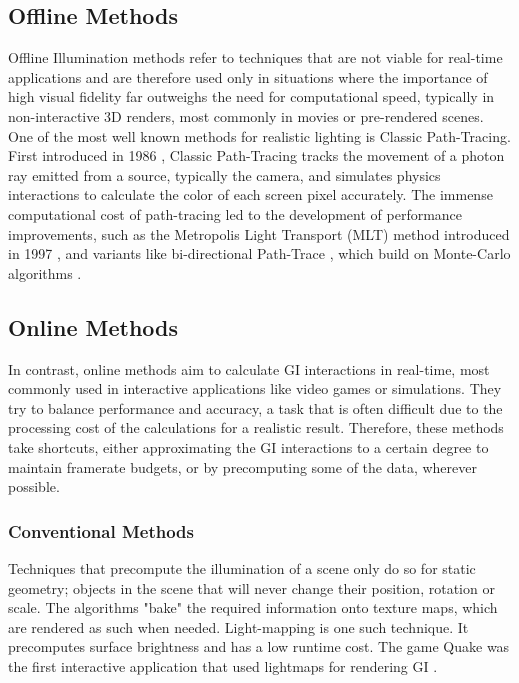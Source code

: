 \subsection{Offline Methods}
\label{sec:offline}
Offline Illumination methods refer to techniques that are not viable for real-time applications and are therefore used only in situations where the importance of high visual fidelity far outweighs the need for computational speed, typically in non-interactive 3D renders, most commonly in movies or pre-rendered scenes. One of the most well known methods for realistic lighting is Classic Path-Tracing. First introduced in 1986 \parencite{Kajiya1986}, Classic Path-Tracing tracks the movement of a photon ray emitted from a source, typically the camera, and simulates physics interactions to calculate the color of each screen pixel accurately. The immense computational cost of path-tracing led to the development of performance improvements, such as the Metropolis Light Transport (MLT) method introduced in 1997 \parencite{Veach1997}, and variants like bi-directional Path-Trace \parencite{Lafortune1993}, which build on Monte-Carlo algorithms \parencite{Lafortune1996}.

\subsection{Online Methods} %
In contrast, online methods aim to calculate GI interactions in real-time, most commonly used in interactive applications like video games or simulations. They try to balance performance and accuracy, a task that is often difficult due to the processing cost of the calculations for a realistic result. Therefore, these methods take shortcuts, either approximating the GI interactions to a certain degree to maintain framerate budgets, or by precomputing some of the data, wherever possible.

\subsubsection*{Conventional Methods} %
Techniques that precompute the illumination of a scene only do so for static geometry; objects in the scene that will never change their position, rotation or scale. The algorithms "bake" the required information onto texture maps, which are rendered as such when needed. Light-mapping is one such technique. It precomputes surface brightness and has a low runtime cost. The game Quake was the first interactive application that used lightmaps for rendering GI \parencite{WikiLightmaps}.

